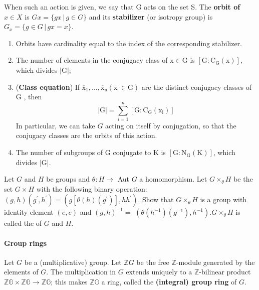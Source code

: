 When such an action is given, we say that G acts on the set S.  The {\bfseries orbit of $x\in X$} is $Gx = \{ gx \, | \, g\in G \}$ and its {\bfseries stabilizer} (or isotropy group) is $G_x = \{ g\in G \, | \, gx = x \}$.



\begin{theo}
    \begin{enumerate}
        \item Orbits have cardinality equal to the index of the corresponding stabilizer.
        \item The number of elements in the conjugacy class of $\mathrm{x} \in \mathrm{G}$ is $\left[\mathrm{G}: \mathrm{C}_{\mathrm{G}}(\mathrm{x})\right]$, which divides $|\mathrm{G}|$;
        \item (\textbf{Class equation}) If $\overline{\mathrm{x}}_1, \ldots, \overline{\mathrm{x}}_{\mathrm{n}}\left(\mathrm{x}_{\mathrm{i}} \in \mathrm{G}\right)$ are the distinct conjugacy classes of G , then $$
|\mathrm{G}|=\sum_{i=1}^n\left[\mathrm{G}: \mathrm{C}_{\mathrm{G}}\left(\mathrm{x}_{\mathrm{i}}\right)\right]
$$ In particular, we can take $G$ acting on itself by conjugation, so that the conjugacy classes are the orbits of this action.
\item The number of subgroups of G conjugate to K is $\left[\mathrm{G}: \mathrm{N}_{\mathrm{G}}(\mathrm{K})\right]$, which divides $|\mathrm{G}|$.
\end{enumerate}
\end{theo}

Let $G$ and $H$ be groups and $\theta: H \rightarrow$ Aut $G$ a homomorphism. Let $G \times_\theta H$ be the set $G \times H$ with the following binary operation: $(g, h)\left(g^{\prime}, h^{\prime}\right)=\left(g\left[\theta(h)\left(g^{\prime}\right)\right], h h^{\prime}\right)$. Show that $G \times_\theta H$ is a group with identity element $(e, e)$ and $(g, h)^{-1}=$ $\left(\theta\left(h^{-1}\right)\left(g^{-1}\right), h^{-1}\right) . G \times_\theta H$ is called the {\bfseries } of $G$ and $H$.

\paragraph*{Group rings}

Let $G$ be a (multiplicative) group. Let $\mathbb{Z} G$ be the free $\mathbb{Z}$-module generated by the elements of $G$. The multiplication in $G$ extends uniquely to a $\mathbb{Z}$-bilinear product $\mathbb{Z G} \times \mathbb{Z G} \rightarrow \mathbb{Z G}$; this makes $\mathbb{Z G}$ a ring, called the \textbf{(integral) group ring} of $G$.

